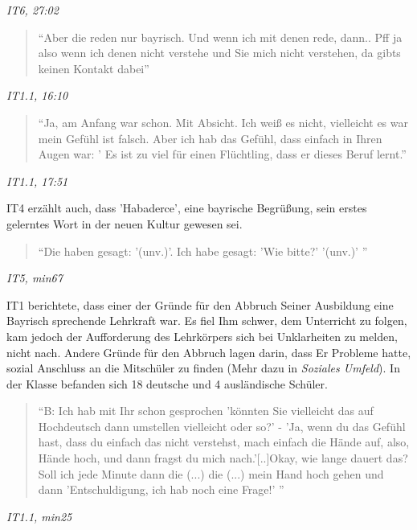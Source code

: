 \centerline{\textit{IT6, 27:02}}
\begin{quote}
    ``Aber die reden nur bayrisch. Und wenn ich mit denen rede, dann.. Pff ja also wenn ich denen nicht verstehe und Sie mich nicht verstehen, da gibts keinen Kontakt dabei''
\end{quote}
\centerline{\textit{IT1.1, 16:10}}
\begin{quote}
    ``Ja, am Anfang war schon. Mit Absicht. Ich weiß es nicht, vielleicht es war mein Gefühl ist falsch. Aber ich hab das Gefühl, dass einfach in Ihren Augen war: ' Es ist zu viel für einen Flüchtling, dass er dieses Beruf lernt.''
\end{quote}
\centerline{\textit{IT1.1, 17:51}}
IT4 erzählt auch, dass 'Habaderce', eine bayrische Begrüßung, sein erstes gelerntes Wort in der neuen Kultur gewesen sei.
\begin{quote}
    ``Die haben gesagt: '(unv.)'. Ich habe gesagt: 'Wie bitte?' '(unv.)' ''
\end{quote}
\centerline{\textit{IT5, min67}}
IT1 berichtete, dass einer der Gründe für den Abbruch Seiner Ausbildung eine Bayrisch sprechende Lehrkraft war. Es fiel Ihm schwer, dem Unterricht zu folgen, kam jedoch der Aufforderung des Lehrkörpers sich bei Unklarheiten zu melden, nicht nach. Andere Gründe für den Abbruch lagen darin, dass Er Probleme hatte, sozial Anschluss an die Mitschüler zu finden (Mehr dazu in \textit{Soziales Umfeld}). 
In der Klasse befanden sich 18 deutsche und 4 ausländische Schüler.

\begin{quote}
    ``B: Ich hab mit Ihr schon gesprochen 'könnten Sie vielleicht das auf Hochdeutsch dann umstellen vielleicht oder so?' - 'Ja, wenn du das Gefühl hast, dass du einfach das nicht verstehst, mach einfach die Hände auf, also, Hände hoch, und dann fragst du mich nach.'[..]Okay, wie lange dauert das? Soll ich jede Minute dann die (...) die (...) mein Hand hoch gehen und dann 'Entschuldigung, ich hab noch eine Frage!' ''
\end{quote}
\centerline{\textit{IT1.1, min25}}